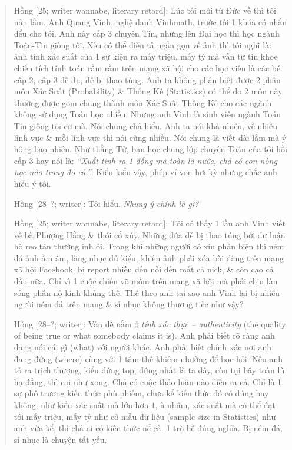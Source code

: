 \documentclass[12pt,oneside]{book}
\begin{document}
\begin{quote}
	{\sf Hồng [25; writer wannabe, literary retard]}: Lúc tôi mới từ Đức về thì tôi nản lắm. Anh Quang Vinh, nghệ danh Vinhmath, trước tôi 1 khóa có nhắn đểu cho tôi. Anh này cấp 3 chuyên Tin, nhưng lên Đại học thì học ngành Toán-Tin giống tôi. Nếu có thể diễn tả ngắn gọn về ảnh thì tôi nghĩ là: ảnh tính xác suất của 1 sự kiện ra mấy triệu, mấy tỷ mà vẫn tự tin khoe chiến tích tính toán rầm rầm trên mạng xã hội cho các học viên là các bé cấp 2, cấp 3 dễ dụ, dễ bị thao túng. Anh ta không phân biệt được 2 phân môn Xác Suất (Probability) \& Thống Kê (Statistics) có thể do 2 môn này thường được gom chung thành môn Xác Suất Thống Kê cho các ngành không sử dụng Toán học nhiều. Nhưng anh Vinh là sinh viên ngành Toán Tin giống tôi cơ mà. Nói chung chả hiểu. Anh ta nói khá nhiều, về nhiều lĩnh vực \& mỗi lĩnh vực thì nói cũng nhiều. Nói chung là viết dài lắm mà ý hông bao nhiêu. Như thằng {\sf Tử}, bạn học chung lớp chuyên Toán của tôi hồi cấp 3 hay nói là: {\it``Xuất tinh ra 1 đống mà toàn là nước, chả có con nòng nọc nào trong đó cả.''}. Kiểu kiểu vậy, phép ví von hơi kỳ nhưng chắc anh hiểu ý tôi.
	
	{\sf Hồng [28--?; writer]}: Tôi hiểu. {\it Nhưng ý chính là gì?}
	
	{\sf Hồng [25; writer wannabe, literary retard]}: Tôi có thấy 1 lần anh Vinh viết về bà Phượng Hằng \& thói cổ xúy. Những đứa dễ bị thao túng bởi dư luận hò reo tán thưởng inh ỏi. Trong khi những người có xíu phản biện thì ném đá ảnh ầm ầm, lăng nhục đủ kiểu, khiến ảnh phải xóa bài đăng trên mạng xã hội Facebook, bị report nhiều đến nỗi đến mất cả nick, \& còn cạo cả đầu nữa. Chỉ vì 1 cuộc chiến võ mồm trên mạng xã hội mà phải chịu làn sóng phẫn nộ kinh khủng thế. Thế theo anh tại sao anh Vinh lại bị nhiều người ném đá trên mạng \& sỉ nhục không thương tiếc như vậy?
	
	{\sf Hồng [28--?; writer]}: Vấn đề nằm ở {\it tính xác thực -- authenticity} ({\sf[n] the quality of being true or what somebody claims it is}). Anh phải biết rõ ràng anh đang nói cái gì (what) với người khác. Anh phải biết chính xác nơi anh đang đứng (where) cùng với 1 tâm thế khiêm nhường để học hỏi. Nếu anh tỏ ra trịch thượng, kiểu đứng top, đứng nhất là ta đây, còn tụi bây toàn lũ hạ đẳng, thì coi như xong. Chả có cuộc thảo luận nào diễn ra cả. Chỉ là 1 sự phô trương kiến thức phù phiếm, chưa kể kiến thức đó có đúng hay không, như kiểu xác suất mà lớn hơn $1$, à nhầm, xác suất mà có thể đạt tới mấy triệu, mấy tỷ như cỡ mẫu dữ liệu (sample size in Statistics) như anh vừa kể, thì chả ai có kiến thức nể cả. 1 trò hề đúng nghĩa. Bị ném đá, sỉ nhục là chuyện tất yếu.
	

\end{quote}
\end{document}
